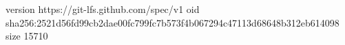 version https://git-lfs.github.com/spec/v1
oid sha256:2521d56fd99cb2dae00fc799fc7b573f4b067294c47113d68648b312eb614098
size 15710
